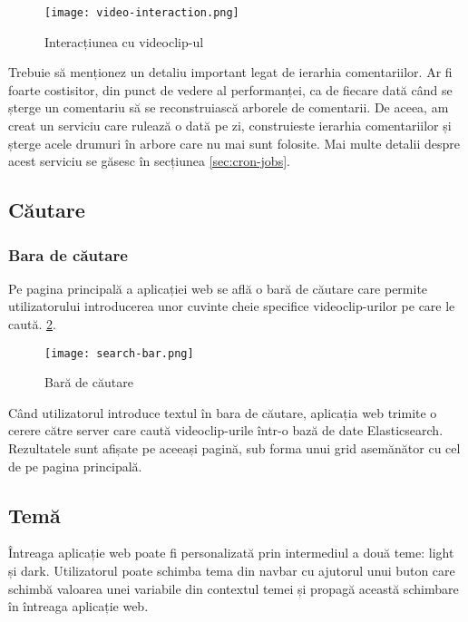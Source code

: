 \begin{figure}[h]
    \centering
    \texttt{[image: video-interaction.png]}
    \caption{Interacțiunea cu videoclip-ul}
    \label{fig:video-interaction}

\end{figure}

\par

Trebuie să menționez un detaliu important legat de ierarhia comentariilor. Ar fi foarte costisitor,
din punct de vedere al performanței, ca de fiecare dată când se șterge un comentariu să se reconstruiască
arborele de comentarii. De aceea, am creat un serviciu care rulează o dată pe zi, construieste ierarhia
comentariilor și șterge acele drumuri în arbore care nu mai sunt folosite. Mai multe detalii despre
acest serviciu se găsesc în secțiunea \ref{sec:cron-jobs}.

\subsection{Căutare}
\subsubsection{Bara de căutare}
Pe pagina principală a aplicației web se află o bară de căutare care permite utilizatorului
introducerea unor cuvinte cheie specifice videoclip-urilor pe care le caută.
\ref {fig:search-bar}.

\vspace{1em}
\begin{figure}[h]
    \centering
    \texttt{[image: search-bar.png]}
    \caption{Bară de căutare}
    \label{fig:search-bar}
\end{figure}

\par
Când utilizatorul introduce textul în bara de căutare, aplicația web trimite o cerere 
către server care caută videoclip-urile într-o bază de date Elasticsearch. Rezultatele
sunt afișate pe aceeași pagină, sub forma unui grid asemănător cu cel de pe pagina principală.

\subsection{Temă}
Întreaga aplicație web poate fi personalizată prin intermediul a două teme: light și dark.
Utilizatorul poate schimba tema din navbar cu ajutorul unui buton care schimbă valoarea
unei variabile din contextul temei și propagă această schimbare în întreaga aplicație web.

